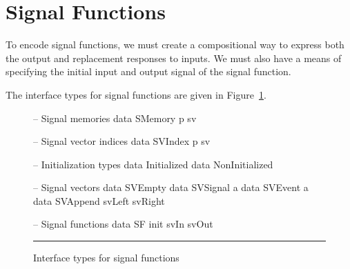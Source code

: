 \section{Signal Functions}
\label{section:Implementation-Signal_Functions}

To encode signal functions, we must create a compositional way to express
both the output and replacement responses to inputs. We must also have a means
of specifying the initial input and output signal of the signal function.

The interface types for signal functions are given in 
Figure~\ref{figure:signal-function-interface-types}.

\begin{figure}
\begin{minipage}[b]{0.5\linewidth}
\begin{code}
-- Signal memories
data SMemory p sv

-- Signal vector indices
data SVIndex p sv

-- Initialization types
data Initialized
data NonInitialized
\end{code}
\end{minipage}
\hspace{0.5cm}
\begin{minipage}[b]{0.5\linewidth}
\begin{code}
-- Signal vectors
data SVEmpty
data SVSignal a
data SVEvent a
data SVAppend svLeft svRight

-- Signal functions
data SF init svIn svOut
\end{code}
\end{minipage}
\vspace{\parskip}
\hrule
\caption{Interface types for signal functions}
\label{figure:signal-function-interface-types}
\end{figure}

